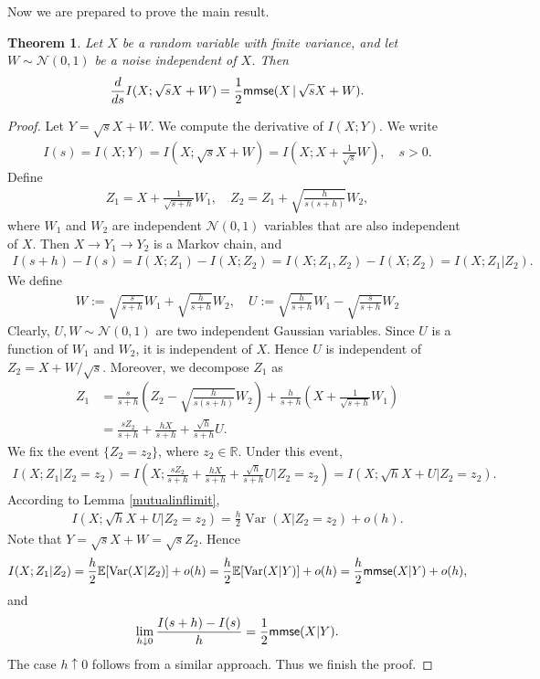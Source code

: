 \documentclass{article}
\numberwithin{equation}{section}
\newcommand{\E}{\mathbb{E}}
\newcommand{\bbR}{\mathbb{R}}
\renewcommand{\cal}{\mathcal}
\DeclareMathOperator{\var}{Var}
\theoremstyle{plain}
\newtheorem{theorem}{Theorem}[section]
\theoremstyle{definition}
\begin{document}
Now we are prepared to prove the main result.
\begin{theorem}\label{immse}
Let $X$ be a random variable with finite variance, and let $W\sim\cal{N}(0,1)$ be a noise independent of $X$. Then
\begin{align*}
	\frac{d}{ds}I(X;\sqrt{s}X+W)=\frac{1}{2}{\sf mmse}(X\,|\,\sqrt{s}X+W).
\end{align*}
\end{theorem}
\begin{proof}
Let $Y=\sqrt{s}X+W$. We compute the derivative of $I(X;Y)$. We write
\begin{align*}
	I(s)=I(X;Y)=I(X;\sqrt{s}X+W)=I\left(X;X+\frac{1}{\sqrt{s}}W\right),\quad s>0.
\end{align*} 
Define
\begin{align*}
	Z_1=X+\frac{1}{\sqrt{s+h}}W_1,\quad Z_2=Z_1+\sqrt{\frac{h}{s(s+h)}}W_2,
\end{align*}
where $W_1$ and $W_2$ are independent $\cal{N}(0,1)$ variables that are also independent of $X$. Then $X\to Y_1\to Y_2$ is a Markov chain, and
\begin{align*}
	I(s+h)-I(s)=I(X;Z_1)-I(X;Z_2)=I(X;Z_1,Z_2)-I(X;Z_2)=I(X;Z_1|Z_2).
\end{align*}
We define
\begin{align*}
	W:=\sqrt{\frac{s}{s+h}}W_1+\sqrt{\frac{h}{s+h}}W_2,\quad U:=\sqrt{\frac{h}{s+h}}W_1-\sqrt{\frac{s}{s+h}}W_2
\end{align*}
Clearly, $U,W\sim\cal{N}(0,1)$ are two independent Gaussian variables. Since $U$ is a function of $W_1$ and $W_2$, it is independent of $X$. Hence $U$ is independent of $Z_2=X+W/\sqrt{s}$. Moreover, we decompose $Z_1$ as
\begin{align*}
	Z_1&=\frac{s}{s+h}\left(Z_2-\sqrt{\frac{h}{s(s+h)}}W_2\right)+\frac{h}{s+h}\left(X+\frac{1}{\sqrt{s+h}}W_1\right)\\
	&=\frac{sZ_2}{s+h}+\frac{hX}{s+h}+\frac{\sqrt{h}}{s+h}U.
\end{align*}
We fix the event $\{Z_2=z_2\}$, where $z_2\in\bbR$. Under this event,
\begin{align*}
	I(X;Z_1|Z_2=z_2)=I\left(X;\frac{sZ_2}{s+h}+\frac{hX}{s+h}+\frac{\sqrt{h}}{s+h}U\bigg|Z_2=z_2\right)=I(X;\sqrt{h}X+U|Z_2=z_2).
\end{align*}
According to Lemma \ref{mutualinflimit},
\begin{align*}
	I(X;\sqrt{h}X+U|Z_2=z_2)=\frac{h}{2}\var(X|Z_2=z_2)+o(h).
\end{align*}
Note that $Y=\sqrt{s}X+W=\sqrt{s}Z_2$. Hence
\begin{align*}
	I(X;Z_1|Z_2)=\frac{h}{2}\E[\var(X|Z_2)]+o(h)=\frac{h}{2}\E[\var(X|Y)]+o(h)=\frac{h}{2}{\sf mmse}(X|Y)+o(h),
\end{align*}
and
\begin{align*}
	\lim_{h\downarrow 0}\frac{I(s+h)-I(s)}{h}=\frac{1}{2}{\sf mmse}(X|Y).
\end{align*}
The case $h\uparrow 0$ follows from a similar approach. Thus we finish the proof.
\end{proof}
\end{document}
